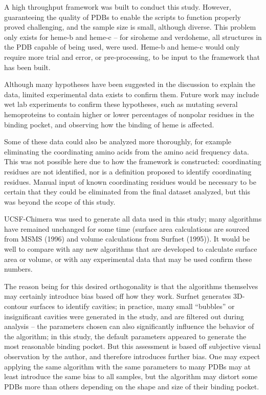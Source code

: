 \documentclass[a4paper, nobind]{templates/ociamthesis}
\begin{document}
A high throughput framework was built to conduct this study. However, guaranteeing the quality of PDBs to enable the scripts to function properly proved challenging, and the sample size is small, although diverse. This problem only exists for heme-b and heme-c -- for siroheme and verdoheme, all structures in the PDB capable of being used, were used. Heme-b and heme-c would only require more trial and error, or pre-processing, to be input to the framework that has been built.

Although many hypotheses have been suggested in the discussion to explain the data, limited experimental data exists to confirm them. Future work may include wet lab experiments to confirm these hypotheses, such as mutating several hemoproteins to contain higher or lower percentages of nonpolar residues in the binding pocket, and observing how the binding of heme is affected.

Some of these data could also be analyzed more thoroughly, for example eliminating the coordinating amino acids from the amino acid frequency data. This was not possible here due to how the framework is constructed: coordinating residues are not identified, nor is a definition proposed to identify coordinating residues. Manual input of known coordinating residues would be necessary to be certain that they could be eliminated from the final dataset analyzed, but this was beyond the scope of this study.

UCSF-Chimera was used to generate all data used in this study; many algorithms have remained unchanged for some time (surface area calculations are sourced from MSMS (1996) and volume calculations from Surfnet (1995)). It would be well to compare with any new algorithms that are developed to calculate surface area or volume, or with any experimental data that may be used confirm these numbers.

The reason being for this desired orthogonality is that the algorithms themselves may certainly introduce bias based off how they work. Surfnet generates 3D-contour surfaces to identify cavities; in practice, many small ``bubbles'' or insignificant cavities were generated in the study, and are filtered out during analysis -- the parameters chosen can also significantly influence the behavior of the algorithm; in this study, the default parameters appeared to generate the most reasonable binding pocket. But this assessment is based off subjective visual observation by the author, and therefore introduces further bias. One may expect applying the same algorithm with the same parameters to many PDBs may at least introduce the same bias to all samples, but the algorithm may distort some PDBs more than others depending on the shape and size of their binding pocket.
\end{document}
